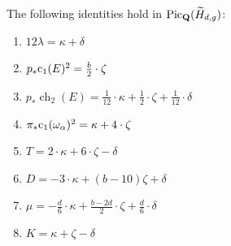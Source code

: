 \documentclass{amsart}
\DeclareMathOperator{\ch}{ch}
\renewcommand{\c}{{\rm c}}
\providecommand {\Q}{{\bf Q}}
\providecommand{\Pic}{\operatorname{Pic}}
\numberwithin{equation}{section}
\begin{document}
\begin{proposition}\label{prop:relations}
  The following identities hold in $\Pic_\Q(\widetilde H_{d,g})$:
  \begin{enumerate}
  \item $12 \lambda = \kappa + \delta$
  \item $p_*\c_1(E)^2 = \frac{b}{2} \cdot \zeta$
  \item $p_*\ch_2(E) = \frac{1}{12} \cdot \kappa + \frac{1}{2} \cdot \zeta + \frac{1}{12} \cdot \delta$
  \item $\pi_* \c_1(\omega_\alpha)^2 = \kappa + 4\cdot \zeta$
  \item $T = 2\cdot\kappa + 6\cdot\zeta - \delta$
  \item $D = -3\cdot\kappa +(b-10)\zeta + \delta$
  \item $\mu = -\frac{d}{6}\cdot\kappa + \frac{b-2d}{2}\cdot \zeta + \frac{d}{6}\cdot\delta$
  \item $K = \kappa + \zeta - \delta$
  \end{enumerate}
\end{proposition}
\end{document}
